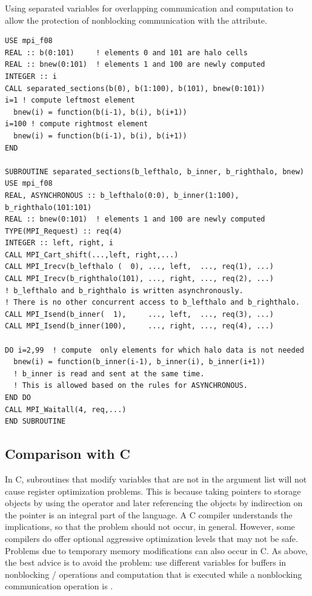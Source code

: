 \begin{example}
Using separated variables for overlapping communication and computation to allow
the protection of nonblocking communication with the  attribute.
\label{exa:lang:async:separated}
%
\begin{lstlisting}[language={[MPI08dirs]Fortran},basicstyle=\lstsmall]
USE mpi_f08
REAL :: b(0:101)     ! elements 0 and 101 are halo cells
REAL :: bnew(0:101)  ! elements 1 and 100 are newly computed
INTEGER :: i
CALL separated_sections(b(0), b(1:100), b(101), bnew(0:101))
i=1 ! compute leftmost element
  bnew(i) = function(b(i-1), b(i), b(i+1))
i=100 ! compute rightmost element
  bnew(i) = function(b(i-1), b(i), b(i+1))
END

SUBROUTINE separated_sections(b_lefthalo, b_inner, b_righthalo, bnew)
USE mpi_f08
REAL, ASYNCHRONOUS :: b_lefthalo(0:0), b_inner(1:100), b_righthalo(101:101)
REAL :: bnew(0:101)  ! elements 1 and 100 are newly computed
TYPE(MPI_Request) :: req(4)
INTEGER :: left, right, i
CALL MPI_Cart_shift(...,left, right,...)
CALL MPI_Irecv(b_lefthalo (  0), ..., left,  ..., req(1), ...)
CALL MPI_Irecv(b_righthalo(101), ..., right, ..., req(2), ...)
! b_lefthalo and b_righthalo is written asynchronously.
! There is no other concurrent access to b_lefthalo and b_righthalo.
CALL MPI_Isend(b_inner(  1),     ..., left,  ..., req(3), ...)
CALL MPI_Isend(b_inner(100),     ..., right, ..., req(4), ...)

DO i=2,99  ! compute  only elements for which halo data is not needed
  bnew(i) = function(b_inner(i-1), b_inner(i), b_inner(i+1))
  ! b_inner is read and sent at the same time.
  ! This is allowed based on the rules for ASYNCHRONOUS.
END DO
CALL MPI_Waitall(4, req,...)
END SUBROUTINE
\end{lstlisting}
\end{example}

\subsection{Comparison with C}
\label{sec:f90-problems:comparison-with-C}

In C, subroutines that modify variables that are not in the argument
list will not cause register optimization problems.  This is because
taking pointers to storage objects by using the \code{\&} operator and
later referencing the objects by indirection on the pointer is an integral
part of the language.
A C compiler understands the implications,
so that the problem should not occur, in general.  However,
some compilers do offer optional aggressive optimization levels that may not
be safe.
Problems due to temporary memory modifications can also occur in C.
As above, the best advice is to avoid the problem:
use different variables for buffers in nonblocking \MPI/ operations
and computation that is executed while a nonblocking
communication operation is .

